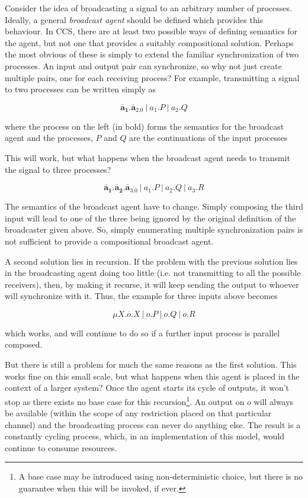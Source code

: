 Consider the idea of broadcasting a signal to an arbitrary number of
processes.  Ideally, a general \emph{broadcast agent} should be
defined which provides this behaviour.  In CCS, there are at least two
possible ways of defining semantics for the agent, but not one that
provides a suitably compositional solution.  Perhaps the most obvious
of these is simply to extend the familiar synchronization of two
processes.  An input and output pair can synchronize, so why not just
create multiple pairs, one for each receiving process?  For example,
transmitting a signal to two processes can be written simply as

\begin{equation}
\mathbf{\overline{a}_1.\overline{a}_2.0}\ |\ a_1.P\ |\ a_2.Q
\end{equation}

\noindent where the process on the left (in bold) forms the semantics
for the broadcast agent and the processes, $P$ and $Q$ are the
continuations of the input processes

This will work, but what happens when the broadcast agent needs to
transmit the signal to three processes?

\begin{equation}
\mathbf{\overline{a}_1.\overline{a}_2.\overline{a}_3.0}\ |\ a_1.P\ |\ a_2.Q\ |\ a_3.R
\end{equation}

\noindent The semantics of the broadcast agent have to change.  Simply
composing the third input will lead to one of the three being ignored
by the original definition of the broadcaster given above.  So, simply
enumerating multiple synchronization pairs is not sufficient to
provide a compositional broadcast agent.

A second solution lies in recursion.  If the problem with the previous
solution lies in the broadcasting agent doing too little (i.e. not
transmitting to all the possible receivers), then, by making it
recurse, it will keep sending the output to whoever will synchronize
with it.  Thus, the example for three inputs above becomes

\begin{equation}
\mu X.\overline{o}.X\ |\ o.P\ |\ o.Q\ |\ o.R
\end{equation}

\noindent which works, and will continue to do so if a further
input process is parallel composed.  

But there is still a problem for much the same reasons as the first
solution.  This works fine on this small scale, but what happens when
this agent is placed in the context of a larger system?  Once the agent
starts its cycle of outputs, it won't stop as there exists
no base case for this recursion\footnote{A base case may be introduced
using non-deterministic choice, but there is no guarantee when this will
be invoked, if ever.}.  An output on $o$ will always be available (within
the scope of any restriction placed on that particular channel) and
the broadcasting process can never do anything else.  The result is a
constantly cycling process, which, in an implementation of this model,
would continue to consume resources.

